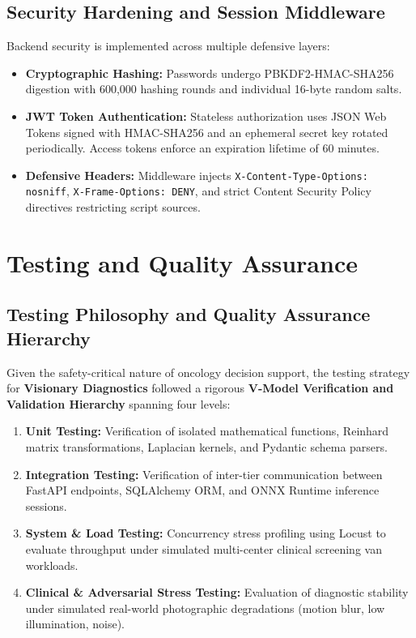 \documentclass[12pt,a4paper,oneside]{report}
\begin{document}
\section{Security Hardening and Session Middleware}
\label{sec:security_impl}

Backend security is implemented across multiple defensive layers:
\begin{itemize}
    \item \textbf{Cryptographic Hashing:} Passwords undergo PBKDF2-HMAC-SHA256 digestion with 600,000 hashing rounds and individual 16-byte random salts.
    \item \textbf{JWT Token Authentication:} Stateless authorization uses JSON Web Tokens signed with HMAC-SHA256 and an ephemeral secret key rotated periodically. Access tokens enforce an expiration lifetime of 60 minutes.
    \item \textbf{Defensive Headers:} Middleware injects \texttt{X-Content-Type-Options: nosniff}, \texttt{X-Frame-Options: DENY}, and strict Content Security Policy directives restricting script sources.
\end{itemize}



\chapter{Testing and Quality Assurance}
\label{ch:testing_qa}

\section{Testing Philosophy and Quality Assurance Hierarchy}
\label{sec:testing_philosophy}

Given the safety-critical nature of oncology decision support, the testing strategy for \textbf{Visionary Diagnostics} followed a rigorous \textbf{V-Model Verification and Validation Hierarchy} spanning four levels:

\begin{enumerate}
    \item \textbf{Unit Testing:} Verification of isolated mathematical functions, Reinhard matrix transformations, Laplacian kernels, and Pydantic schema parsers.
    \item \textbf{Integration Testing:} Verification of inter-tier communication between FastAPI endpoints, SQLAlchemy ORM, and ONNX Runtime inference sessions.
    \item \textbf{System \& Load Testing:} Concurrency stress profiling using Locust to evaluate throughput under simulated multi-center clinical screening van workloads.
    \item \textbf{Clinical \& Adversarial Stress Testing:} Evaluation of diagnostic stability under simulated real-world photographic degradations (motion blur, low illumination, noise).
\end{enumerate}
\end{document}
